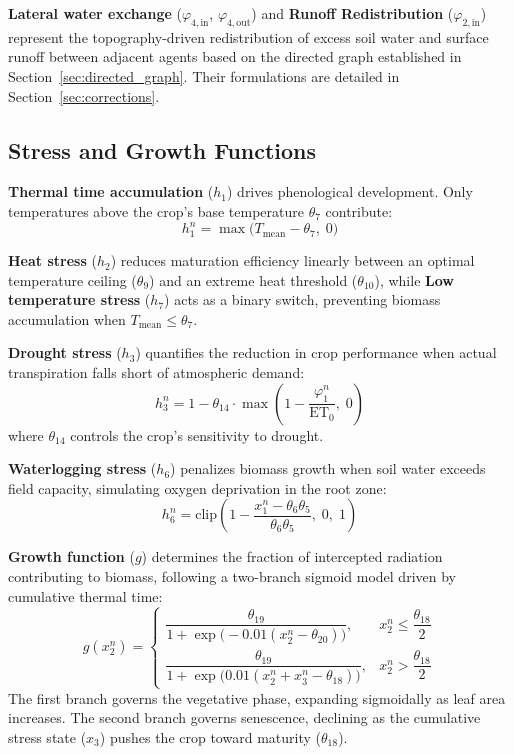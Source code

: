 \textbf{Lateral water exchange} ($\varphi_{4,\text{in}}$, $\varphi_{4,\text{out}}$) and \textbf{Runoff Redistribution} ($\varphi_{2,\text{in}}$) represent the topography-driven redistribution of excess soil water and surface runoff between adjacent agents based on the directed graph established in Section~\ref{sec:directed_graph}. Their formulations are detailed in Section~\ref{sec:corrections}.

\subsection{Stress and Growth Functions}
\label{sec:stress_growth}

\textbf{Thermal time accumulation} ($h_1$) drives phenological development. Only temperatures above the crop's base temperature $\theta_7$ contribute:
\begin{equation}
    h_1^n = \max\!\bigl(T_{\text{mean}} - \theta_7,\; 0\bigr)
    \label{eq:h1}
\end{equation}

\textbf{Heat stress} ($h_2$) reduces maturation efficiency linearly between an optimal temperature ceiling ($\theta_9$) and an extreme heat threshold ($\theta_{10}$), while \textbf{Low temperature stress} ($h_7$) acts as a binary switch, preventing biomass accumulation when $T_{\text{mean}} \leq \theta_7$.

\textbf{Drought stress} ($h_3$) quantifies the reduction in crop performance when actual transpiration falls short of atmospheric demand:
\begin{equation}
    h_3^n = 1 - \theta_{14} \cdot \max\!\left(1 - \frac{\varphi_1^n}{\text{ET}_0},\; 0\right)
    \label{eq:h3}
\end{equation}
where $\theta_{14}$ controls the crop's sensitivity to drought. 

\textbf{Waterlogging stress} ($h_6$) penalizes biomass growth when soil water exceeds field capacity, simulating oxygen deprivation in the root zone:
\begin{equation}
    h_6^n = \text{clip}\!\left(1 - \frac{x_1^n - \theta_6 \theta_5}{\theta_6 \theta_5},\; 0,\; 1\right)
    \label{eq:h6}
\end{equation}

\textbf{Growth function} ($g$) determines the fraction of intercepted radiation contributing to biomass, following a two-branch sigmoid model driven by cumulative thermal time:
\begin{equation}
    g(x_2^n) = 
    \begin{cases}
        \dfrac{\theta_{19}}{1 + \exp\!\bigl(-0.01(x_2^n - \theta_{20})\bigr)}, & x_2^n \leq \dfrac{\theta_{18}}{2} \\[14pt]
        \dfrac{\theta_{19}}{1 + \exp\!\bigl(0.01(x_2^n + x_3^n - \theta_{18})\bigr)}, & x_2^n > \dfrac{\theta_{18}}{2}
    \end{cases}
    \label{eq:growth}
\end{equation}
The first branch governs the vegetative phase, expanding sigmoidally as leaf area increases. The second branch governs senescence, declining as the cumulative stress state ($x_3$) pushes the crop toward maturity ($\theta_{18}$).

